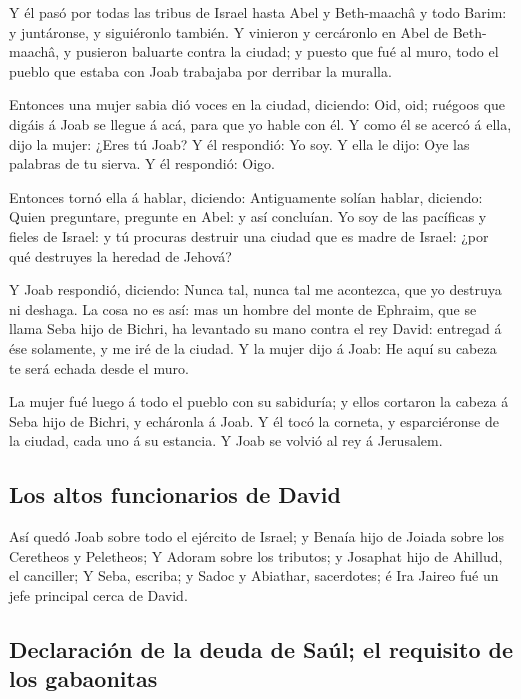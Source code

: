  Y él pasó por todas las tribus de Israel hasta Abel y
Beth-maachâ y todo Barim: y juntáronse, y siguiéronlo también.
 Y vinieron y cercáronlo en Abel de Beth-maachâ, y pusieron
baluarte contra la ciudad; y puesto que fué al muro, todo el pueblo que
estaba con Joab trabajaba por derribar la muralla.

 Entonces una mujer sabia dió voces en la ciudad, diciendo:
Oid, oid; ruégoos que digáis á Joab se llegue á acá, para que yo hable
con él.  Y como él se acercó á ella, dijo la mujer: ¿Eres
tú Joab? Y él respondió: Yo soy. Y ella le dijo: Oye las palabras de tu
sierva. Y él respondió: Oigo.

 Entonces tornó ella á hablar, diciendo: Antiguamente
solían hablar, diciendo: Quien preguntare, pregunte en Abel: y así
concluían.  Yo soy de las pacíficas y fieles de Israel: y
tú procuras destruir una ciudad que es madre de Israel: ¿por qué
destruyes la heredad de Jehová?

 Y Joab respondió, diciendo: Nunca tal, nunca tal me
acontezca, que yo destruya ni deshaga.  La cosa no es así:
mas un hombre del monte de Ephraim, que se llama Seba hijo de Bichri, ha
levantado su mano contra el rey David: entregad á ése solamente, y me
iré de la ciudad. Y la mujer dijo á Joab: He aquí su cabeza te será
echada desde el muro.

 La mujer fué luego á todo el pueblo con su sabiduría; y
ellos cortaron la cabeza á Seba hijo de Bichri, y echáronla á Joab. Y él
tocó la corneta, y esparciéronse de la ciudad, cada uno á su estancia. Y
Joab se volvió al rey á Jerusalem.

\hypertarget{los-altos-funcionarios-de-david}{%
\subsection{Los altos funcionarios de
David}\label{los-altos-funcionarios-de-david}}

 Así quedó Joab sobre todo el ejército de Israel; y Benaía
hijo de Joiada sobre los Ceretheos y Peletheos;  Y Adoram
sobre los tributos; y Josaphat hijo de Ahillud, el canciller;
 Y Seba, escriba; y Sadoc y Abiathar, sacerdotes; é Ira
Jaireo fué un jefe principal cerca de David.

\hypertarget{declaraciuxf3n-de-la-deuda-de-sauxfal-el-requisito-de-los-gabaonitas}{%
\subsection{Declaración de la deuda de Saúl; el requisito de los
gabaonitas}\label{declaraciuxf3n-de-la-deuda-de-sauxfal-el-requisito-de-los-gabaonitas}}

